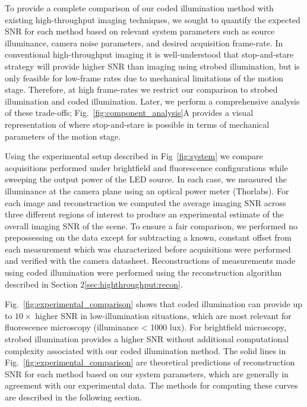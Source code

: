 To provide a complete comparison of our coded illumination method with existing high-throughput imaging techniques, we sought to quantify the expected SNR for each method based on relevant system parameters such as source illuminance, camera noise parameters, and desired acquisition frame-rate. In conventional high-throughput imaging it is well-understood that stop-and-stare strategy will provide higher SNR than imaging using strobed illumination, but is only feasible for low-frame rates due to mechanical limitations of the motion stage. 
Therefore, at high frame-rates we restrict our comparison to strobed illumination and coded illumination. Later, we perform a comprehensive analysis of these trade-offs; Fig.~\ref{fig:component_analysis}A provides a visual representation of where stop-and-stare is possible in terms of mechanical parameters of the motion stage.

Using the experimental setup described in Fig~\ref{fig:system} we compare acquisitions performed under brightfield and fluorescence configurations while sweeping the output power of the LED source. In each case, we measured the illuminance at the camera plane using an optical power meter (Thorlabs). For each image and reconstruction we computed the average imaging SNR across three different regions of interest to produce an experimental estimate of the overall imaging SNR of the scene. To ensure a fair comparison, we performed no prepossessing on the data except for subtracting a known, constant offset from each measurement which was characterized before acquisitions were performed and verified with the camera datasheet. Reconstructions of measurements made using coded illumination were performed using the reconstruction algorithm described in Section 2\ref{sec:highthroughput:recon}. 

Fig.~\ref{fig:experimental_comparison} shows that coded illumination can provide up to $10\times$ higher SNR in low-illumination situations, which are most relevant for fluorescence microscopy (illuminance < 1000 lux). For brightfield microscopy, strobed illumination provides a higher SNR without additional computational complexity associated with our coded illumination method. The solid lines in Fig.~\ref{fig:experimental_comparison} are theoretical predictions of reconstruction SNR for each method based on our system parameters, which are generally in agreement with our experimental data. The methods for computing these curves are described in the following section.

